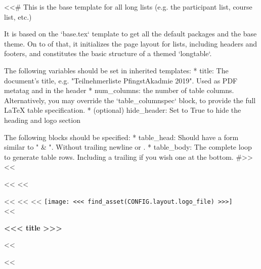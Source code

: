 <<# This is the base template for all long lists (e.g. the participant list, course list, etc.)

    It is based on the `base.tex` template to get all the default packages and the base theme. On to of that, it
    initializes the page layout for lists, including headers and footers, and constitutes the basic structure of a
    themed `longtable`.

    The following variables should be set in inherited templates:
      * title: The document's title, e.g. "Teilnehmerliste PfingstAkadmie 2019". Used as PDF metatag and in the header
      * num_columns: the number of table columns. Alternatively, you may override the `table_columnspec` block, to
        provide the full LaTeX table specification.
      * (optional) hide_header: Set to True to hide the heading and logo section

    The following blocks should be specified:
      * table_head: Should have a form similar to " & ". Without trailing newline
        or \hline.
      * table_body: The complete loop to generate table rows. Including a trailing \hline if you wish one at the bottom.
#>>
<<%

<<%
    \cfoot[]{}
<<%

<<%
    \thispagestyle{plain}
    <<%
        <<%
            \hspace*{\fill}\texttt{[image: <<< find\_asset(CONFIG.layout.logo\_file) >>>]}\\

            \vspace{-2cm}
        <<%
        \begin{center}
            \headingfamily\bfseries\huge{}<<< title >>>
        \end{center}
    <<%

<<%
